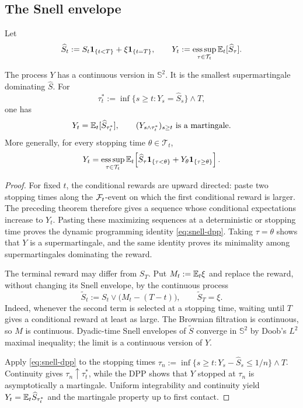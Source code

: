 \subsection{The Snell envelope}

Let
\[
  \widehat S_t:=S_t\mathbf 1_{\{t<T\}}+\xi\mathbf 1_{\{t=T\}},
  \qquad
  Y_t:=\operatorname*{ess\,sup}_{\tau\in\mathcal T_t}
       \mathbb E_t[\widehat S_\tau].
\]

\begin{theorem}
The process $Y$ has a continuous version in $\mathbb{S}^2$. It is the smallest
supermartingale dominating $\widehat S$. For
\[
  \tau_t^*:=\inf\{s\geq t:Y_s=\widehat S_s\}\wedge T,
\]
one has
\[
  Y_t=\mathbb E_t[\widehat S_{\tau_t^*}],
  \qquad
  (Y_{s\wedge\tau_t^*})_{s\geq t}\text{ is a martingale}.
\]
More generally, for every stopping time $\theta\in\mathcal T_t$,
\begin{equation}
  Y_t
  =\operatorname*{ess\,sup}_{\tau\in\mathcal T_t}
   \mathbb E_t\!\left[
     \widehat S_\tau\mathbf 1_{\{\tau<\theta\}}
     +Y_\theta\mathbf 1_{\{\tau\geq\theta\}}
   \right]. \label{eq:snell-dpp}
\end{equation}
\end{theorem}

\begin{proof}
For fixed $t$, the conditional rewards are upward directed: paste two
stopping times along the $\mathcal F_t$-event on which the first conditional reward
is larger. The preceding theorem therefore gives a sequence whose
conditional expectations increase to $Y_t$. Pasting these maximizing
sequences at a deterministic or stopping time proves the dynamic programming
identity \eqref{eq:snell-dpp}. Taking $\tau=\theta$ shows that $Y$ is a
supermartingale, and the same identity proves its minimality among
supermartingales dominating the reward.

The terminal reward may differ from $S_T$. Put $M_t:=\mathbb E_t\xi$ and replace the
reward, without changing its Snell envelope, by the continuous process
\[
  \widetilde S_t:=S_t\vee\bigl(M_t-(T-t)\bigr),
  \qquad \widetilde S_T=\xi.
\]
Indeed, whenever the second term is selected at a stopping time, waiting until
$T$ gives a conditional reward at least as large. The Brownian filtration is
continuous, so $M$ is continuous. Dyadic-time Snell envelopes of
$\widetilde S$ converge in $\mathbb{S}^2$ by Doob's $L^2$ maximal inequality;
the limit is a continuous version of $Y$.

Apply \eqref{eq:snell-dpp} to the stopping times
$\tau_n:=\inf\{s\geq t:Y_s-\widehat S_s\leq1/n\}\wedge T$.
Continuity gives $\tau_n\uparrow\tau_t^*$, while the DPP shows that $Y$ stopped
at $\tau_n$ is asymptotically a martingale. Uniform integrability and
continuity yield
$Y_t=\mathbb E_t\widehat S_{\tau_t^*}$ and the martingale property up to first
contact.
\end{proof}


